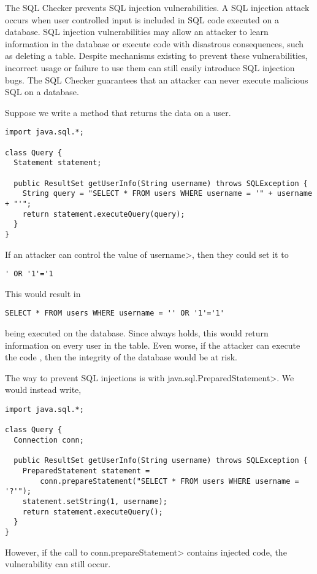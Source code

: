 \htmlhr
{}

The SQL Checker prevents SQL injection vulnerabilities. A SQL injection attack
occurs when user controlled input is included in SQL code executed on a
database. SQL injection vulnerabilities may allow an attacker to learn
information in the database or execute code with disastrous consequences, such
as deleting a table. Despite mechanisms existing to prevent these
vulnerabilities, incorrect usage or failure to use them can still easily
introduce SQL injection bugs. The SQL Checker guarantees that an attacker can
never execute malicious SQL on a database.

Suppose we write a method that returns the data on a user.
\begin{Verbatim}
import java.sql.*;

class Query {
  Statement statement;

  public ResultSet getUserInfo(String username) throws SQLException {
    String query = "SELECT * FROM users WHERE username = '" + username + "'";
    return statement.executeQuery(query);
  }
}
\end{Verbatim}
If an attacker can control the value of \<username>, then they could set it to
\begin{Verbatim}
' OR '1'='1
\end{Verbatim}
This would result in
\begin{Verbatim}
SELECT * FROM users WHERE username = '' OR '1'='1'
\end{Verbatim}
being executed on the database. Since  always holds, this would
return information on every user in the table. Even worse, if the attacker can
execute the code , then the integrity of the database
would be at risk.

The way to prevent SQL injections is with \<java.sql.PreparedStatement>. We
would instead write,
\begin{Verbatim}
import java.sql.*;

class Query {
  Connection conn;

  public ResultSet getUserInfo(String username) throws SQLException {
    PreparedStatement statement =
        conn.prepareStatement("SELECT * FROM users WHERE username = '?'");
    statement.setString(1, username);
    return statement.executeQuery();
  }
}
\end{Verbatim}
However, if the call to \<conn.prepareStatement> contains injected code, the
vulnerability can still occur.

